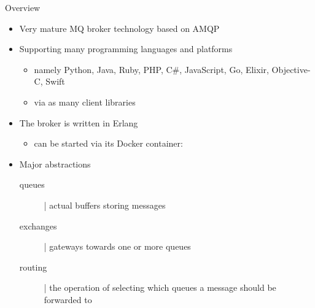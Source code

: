 \documentclass{beamer}\mode<presentation>{\usetheme{AMSBolognaFC}}
\begin{document}
\begin{frame}{Overview \hfill {}}

    \begin{itemize}
        \item Very mature MQ broker technology based on AMQP

        \vfill

        \item Supporting many programming languages and platforms
        \begin{itemize}
            \item namely Python, Java, Ruby, PHP, C\#, JavaScript, Go, Elixir, Objective-C, Swift
            \item via as many \alert{client libraries}
        \end{itemize}

        \vfill

        \item The broker is written in Erlang
        \begin{itemize}
            \item can be started via its Docker container: 
        \end{itemize}

        \vfill

        \item Major abstractions
        \begin{description}
            \item[queues] | actual buffers storing messages
            \item[exchanges] | gateways towards one or more queues
            \item[routing] | the operation of selecting which queues a message should be forwarded to
        \end{description}

    \end{itemize}
\end{frame}
\end{document}
